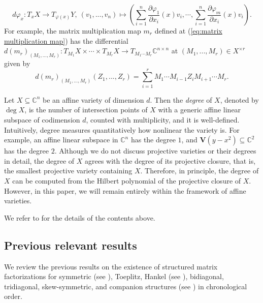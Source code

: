 \documentclass[reqno]{amsart}
\theoremstyle{definition}
\numberwithin{equation}{section}
\begin{document}
\begin{equation*}
    d\varphi_x:T_xX \rightarrow T_{\varphi(x)}Y, ~(v_1,...,v_n) \mapsto \left(\sum_{i=1}^n \frac{\partial \varphi_1}{\partial x_i}(x)v_i,\cdots , \sum_{i=1}^n\frac{\partial \varphi_m}{\partial x_i}(x)v_i\right).
\end{equation*}
For example, the matrix multiplication map $m_r$ defined at (\ref{eq:matrix multiplication map}) has the differential $d(m_r)_{(M_1,...,M_r)}:T_{M_1}X \times \cdots \times T_{M_r}X \rightarrow T_{M_1\cdots M_r}\mathbb{C}^{n \times n}$ at $(M_1,...,M_r) \in X^{\times r}$ given by
\begin{equation*}
    d(m_r)_{(M_1,...,M_r)}(Z_1,...,Z_r)=\sum_{i=1}^rM_1\cdots M_{i-1}Z_iM_{i+1}\cdots M_r.
\end{equation*}

Let $X \subseteq \mathbb{C}^n$ be an affine variety of dimension $d$. Then the \emph{degree} of $X$, denoted by $\deg X$, is the number of intersection points of $X$ with a generic affine linear subspace of codimension $d$, counted with multiplicity, and it is well-defined. Intuitively, degree measures quantitatively how nonlinear the variety is. For example, an affine linear subspace in $\mathbb{C}^n$ has the degree $1$, and $\mathbf{V}(y-x^2) \subseteq \mathbb{C}^2$ has the degree $2$. Although we do not discuss projective varieties or their degrees in detail, the degree of $X$ agrees with the degree of its projective closure, that is, the smallest projective variety containing $X$. Therefore, in principle, the degree of $X$ can be computed from the Hilbert polynomial of the projective closure of $X$. However, in this paper, we will remain entirely within the framework of affine varieties.

We refer to \cite{MR4952933, hartshorne2013algebraic, shafarevich1994basic} for the details of the contents above.

\subsection{Previous relevant results}

We review the previous results on the existence of structured matrix factorizations for symmetric (see \cite{bosch1986factorization}), Toeplitz, Hankel (see \cite{ye2016every}), bidiagonal, tridiagonal, skew-symmetric, and companion structures (see \cite{ye2017new}) in chronological order.
\end{document}
